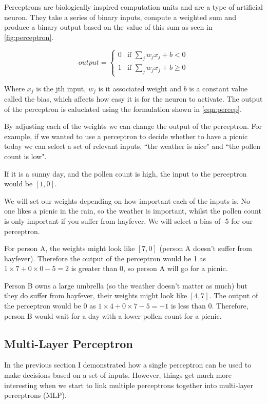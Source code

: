 Perceptrons are biologically inspired computation units and are a type of artificial neuron. They take a series of binary inputs, compute a weighted sum and produce a binary output based on the value of this sum as seen in \autoref{fig:perceptron}.


\begin{equation} \label{eqn:percep}
output = \begin{cases}
0 &\text{if $\sum_{j} w_j x_j + b < 0$}\\
1 &\text{if $\sum_{j} w_j x_j + b \geq 0$}
\end{cases} 
\end{equation}

Where $x_j$ is the jth input, $w_j$ is it associated weight and $b$ is a constant value called the bias, which affects how easy it is for the neuron to activate. The output of the perceptron is caluclated using the formulation shown in \autoref{eqn:percep}.

By adjusting each of the weights we can change the output of the perceptron. For example, if we wanted to use a perceptron to decide whether to have a picnic today we can  select a set of relevant inputs, ``the weather is nice" and ``the pollen count is low".

If it is a sunny day, and the pollen count is high, the input to the perceptron would be $[1,0]$.
 
We will set our weights depending on how important each of the inputs is. No one likes a picnic in the rain, so the weather is important, whilst the pollen count is only important if you suffer from hayfever. We will select a bias of -5 for our perceptron.

For person A, the weights might look like $[7, 0]$ (person A doesn't suffer from hayfever). Therefore the output of the perceptron would be 1 as $1 \times 7 + 0 \times 0 - 5 = 2$ is greater than 0, so person A will go for a picnic.

Person B owns a large umbrella (so the weather doesn't matter as much) but they do suffer from hayfever, their weights might look like $[4, 7]$. The output of the perceptron would be 0 as  $1 \times 4 + 0 \times 7 - 5 = -1$ is less than 0. Therefore, person B would wait for a day with a lower pollen count for a picnic.


\subsection{Multi-Layer Perceptron}
In the previous section I demonstrated how a single perceptron can be used to make decisions based on a set of inputs. However, things get much more interesting when we start to link multiple perceptrons together into multi-layer perceptrons (MLP).

